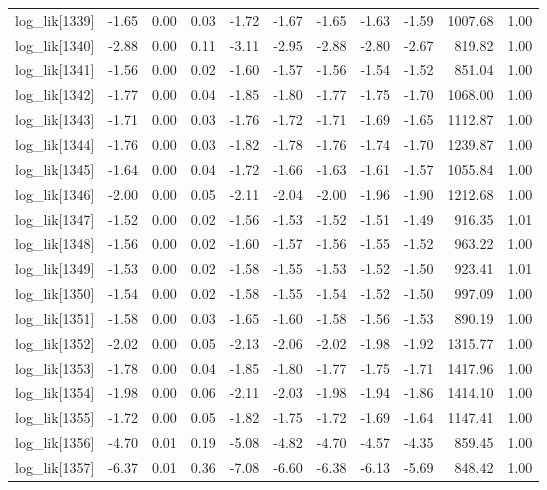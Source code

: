 \begin{table}[ht]
\begin{tabular}{rrrrrrrrrrr}
  log\_lik[1339] & -1.65 & 0.00 & 0.03 & -1.72 & -1.67 & -1.65 & -1.63 & -1.59 & 1007.68 & 1.00 \\ 
  log\_lik[1340] & -2.88 & 0.00 & 0.11 & -3.11 & -2.95 & -2.88 & -2.80 & -2.67 & 819.82 & 1.00 \\ 
  log\_lik[1341] & -1.56 & 0.00 & 0.02 & -1.60 & -1.57 & -1.56 & -1.54 & -1.52 & 851.04 & 1.00 \\ 
  log\_lik[1342] & -1.77 & 0.00 & 0.04 & -1.85 & -1.80 & -1.77 & -1.75 & -1.70 & 1068.00 & 1.00 \\ 
  log\_lik[1343] & -1.71 & 0.00 & 0.03 & -1.76 & -1.72 & -1.71 & -1.69 & -1.65 & 1112.87 & 1.00 \\ 
  log\_lik[1344] & -1.76 & 0.00 & 0.03 & -1.82 & -1.78 & -1.76 & -1.74 & -1.70 & 1239.87 & 1.00 \\ 
  log\_lik[1345] & -1.64 & 0.00 & 0.04 & -1.72 & -1.66 & -1.63 & -1.61 & -1.57 & 1055.84 & 1.00 \\ 
  log\_lik[1346] & -2.00 & 0.00 & 0.05 & -2.11 & -2.04 & -2.00 & -1.96 & -1.90 & 1212.68 & 1.00 \\ 
  log\_lik[1347] & -1.52 & 0.00 & 0.02 & -1.56 & -1.53 & -1.52 & -1.51 & -1.49 & 916.35 & 1.01 \\ 
  log\_lik[1348] & -1.56 & 0.00 & 0.02 & -1.60 & -1.57 & -1.56 & -1.55 & -1.52 & 963.22 & 1.00 \\ 
  log\_lik[1349] & -1.53 & 0.00 & 0.02 & -1.58 & -1.55 & -1.53 & -1.52 & -1.50 & 923.41 & 1.01 \\ 
  log\_lik[1350] & -1.54 & 0.00 & 0.02 & -1.58 & -1.55 & -1.54 & -1.52 & -1.50 & 997.09 & 1.00 \\ 
  log\_lik[1351] & -1.58 & 0.00 & 0.03 & -1.65 & -1.60 & -1.58 & -1.56 & -1.53 & 890.19 & 1.00 \\ 
  log\_lik[1352] & -2.02 & 0.00 & 0.05 & -2.13 & -2.06 & -2.02 & -1.98 & -1.92 & 1315.77 & 1.00 \\ 
  log\_lik[1353] & -1.78 & 0.00 & 0.04 & -1.85 & -1.80 & -1.77 & -1.75 & -1.71 & 1417.96 & 1.00 \\ 
  log\_lik[1354] & -1.98 & 0.00 & 0.06 & -2.11 & -2.03 & -1.98 & -1.94 & -1.86 & 1414.10 & 1.00 \\ 
  log\_lik[1355] & -1.72 & 0.00 & 0.05 & -1.82 & -1.75 & -1.72 & -1.69 & -1.64 & 1147.41 & 1.00 \\ 
  log\_lik[1356] & -4.70 & 0.01 & 0.19 & -5.08 & -4.82 & -4.70 & -4.57 & -4.35 & 859.45 & 1.00 \\ 
  log\_lik[1357] & -6.37 & 0.01 & 0.36 & -7.08 & -6.60 & -6.38 & -6.13 & -5.69 & 848.42 & 1.00 \\ 

\end{tabular}
\end{table}
